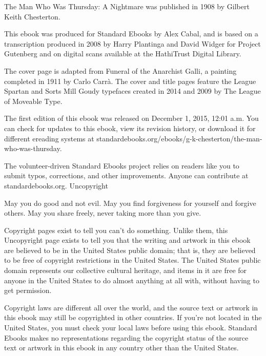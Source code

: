 The Man Who Was Thursday: A Nightmare
was published in 1908 by
Gilbert Keith Chesterton.

This ebook was produced for
Standard Ebooks
by
Alex Cabal,
and is based on a transcription produced in 2008 by
Harry Plantinga and David Widger
for
Project Gutenberg
and on digital scans available at the
HathiTrust Digital Library.

The cover page is adapted from
Funeral of the Anarchist Galli,
a painting completed in 1911 by
Carlo Carrà.
The cover and title pages feature the
League Spartan and Sorts Mill Goudy
typefaces created in 2014 and 2009 by
The League of Moveable Type.

The first edition of this ebook was released on
December 1, 2015, 12:01 a.m.
You can check for updates to this ebook, view its revision history, or download it for different ereading systems at
standardebooks.org/ebooks/g-k-chesterton/the-man-who-was-thursday.

The volunteer-driven Standard Ebooks project relies on readers like you to submit typos, corrections, and other improvements. Anyone can contribute at standardebooks.org.
Uncopyright

    May you do good and not evil. May you find forgiveness for yourself and forgive others. May you share freely, never taking more than you give.

Copyright pages exist to tell you can’t do something. Unlike them, this Uncopyright page exists to tell you that the writing and artwork in this ebook are believed to be in the United States public domain; that is, they are believed to be free of copyright restrictions in the United States. The United States public domain represents our collective cultural heritage, and items in it are free for anyone in the United States to do almost anything at all with, without having to get permission.

Copyright laws are different all over the world, and the source text or artwork in this ebook may still be copyrighted in other countries. If you’re not located in the United States, you must check your local laws before using this ebook. Standard Ebooks makes no representations regarding the copyright status of the source text or artwork in this ebook in any country other than the United States.

